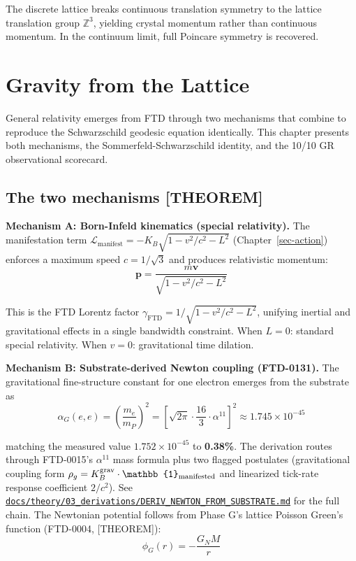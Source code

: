 \documentclass[
  11pt,
  letterpaper,
  twoside,
  openany]{book}
\makeatletter
\let\orig@section\section
\renewcommand{\section}{\needspace{8\baselineskip}\orig@section}
\makeatother
\begin{document}
The discrete lattice breaks continuous translation symmetry to the
lattice translation group \(\mathbb{Z}^3\), yielding crystal momentum
rather than continuous momentum. In the continuum limit, full Poincare
symmetry is recovered.

\chapter{Gravity from the Lattice}\label{sec-gravity}

General relativity emerges from FTD through two mechanisms that combine
to reproduce the Schwarzschild geodesic equation identically. This
chapter presents both mechanisms, the Sommerfeld-Schwarzschild identity,
and the 10/10 GR observational scorecard.

\section{The two mechanisms
{[}THEOREM{]}}\label{the-two-mechanisms-theorem}

\textbf{Mechanism A: Born-Infeld kinematics (special relativity).} The
manifestation term
\(\mathcal{L}_{\text{manifest}} = -K_B\sqrt{1 - v^2/c^2 - L^2}\)
(Chapter~\ref{sec-action}) enforces a maximum speed \(c = 1/\sqrt{3}\)
and produces relativistic momentum: \[
\mathbf{p} = \frac{m\mathbf{v}}{\sqrt{1 - v^2/c^2 - L^2}}
\tag{15.1}
\]

This is the FTD Lorentz factor
\(\gamma_{\text{FTD}} = 1/\sqrt{1 - v^2/c^2 - L^2}\), unifying inertial
and gravitational effects in a single bandwidth constraint. When
\(L = 0\): standard special relativity. When \(v = 0\): gravitational
time dilation.

\textbf{Mechanism B: Substrate-derived Newton coupling (FTD-0131).} The
gravitational fine-structure constant for one electron emerges from the
substrate as \[
\alpha_G(e,e) = \left(\frac{m_e}{m_P}\right)^2 = \left[\sqrt{2\pi}\cdot\frac{16}{3}\cdot\alpha^{11}\right]^2 \approx 1.745 \times 10^{-45}
\tag{15.2}
\]

matching the measured value \(1.752 \times 10^{-45}\) to
\textbf{0.38\%}. The derivation routes through FTD-0015's
\(\alpha^{11}\) mass formula plus two flagged postulates (gravitational
coupling form
\(\rho_g = K_B^{\rm grav}\cdot\mathbb{1}_{\rm manifested}\) and
linearized tick-rate response coefficient \(2/c^2\)). See
\href{https://github.com/}{\texttt{docs/theory/03\_derivations/DERIV\_NEWTON\_FROM\_SUBSTRATE.md}}
for the full chain. The Newtonian potential follows from Phase G's
lattice Poisson Green's function (FTD-0004, {[}THEOREM{]}): \[
\phi_G(r) = -\frac{G_N M}{r}
\tag{15.3}
\]
\end{document}
